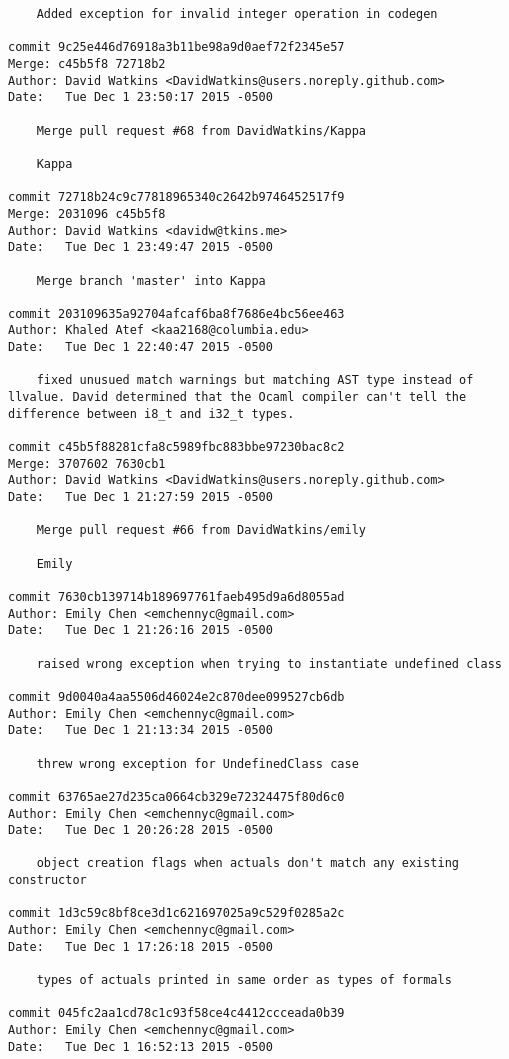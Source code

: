 \begin{verbatim}
    Added exception for invalid integer operation in codegen

commit 9c25e446d76918a3b11be98a9d0aef72f2345e57
Merge: c45b5f8 72718b2
Author: David Watkins <DavidWatkins@users.noreply.github.com>
Date:   Tue Dec 1 23:50:17 2015 -0500

    Merge pull request #68 from DavidWatkins/Kappa
    
    Kappa

commit 72718b24c9c77818965340c2642b9746452517f9
Merge: 2031096 c45b5f8
Author: David Watkins <davidw@tkins.me>
Date:   Tue Dec 1 23:49:47 2015 -0500

    Merge branch 'master' into Kappa

commit 203109635a92704afcaf6ba8f7686e4bc56ee463
Author: Khaled Atef <kaa2168@columbia.edu>
Date:   Tue Dec 1 22:40:47 2015 -0500

    fixed unusued match warnings but matching AST type instead of llvalue. David determined that the Ocaml compiler can't tell the difference between i8_t and i32_t types.

commit c45b5f88281cfa8c5989fbc883bbe97230bac8c2
Merge: 3707602 7630cb1
Author: David Watkins <DavidWatkins@users.noreply.github.com>
Date:   Tue Dec 1 21:27:59 2015 -0500

    Merge pull request #66 from DavidWatkins/emily
    
    Emily

commit 7630cb139714b189697761faeb495d9a6d8055ad
Author: Emily Chen <emchennyc@gmail.com>
Date:   Tue Dec 1 21:26:16 2015 -0500

    raised wrong exception when trying to instantiate undefined class

commit 9d0040a4aa5506d46024e2c870dee099527cb6db
Author: Emily Chen <emchennyc@gmail.com>
Date:   Tue Dec 1 21:13:34 2015 -0500

    threw wrong exception for UndefinedClass case

commit 63765ae27d235ca0664cb329e72324475f80d6c0
Author: Emily Chen <emchennyc@gmail.com>
Date:   Tue Dec 1 20:26:28 2015 -0500

    object creation flags when actuals don't match any existing constructor

commit 1d3c59c8bf8ce3d1c621697025a9c529f0285a2c
Author: Emily Chen <emchennyc@gmail.com>
Date:   Tue Dec 1 17:26:18 2015 -0500

    types of actuals printed in same order as types of formals

commit 045fc2aa1cd78c1c93f58ce4c4412ccceada0b39
Author: Emily Chen <emchennyc@gmail.com>
Date:   Tue Dec 1 16:52:13 2015 -0500


\end{verbatim}
